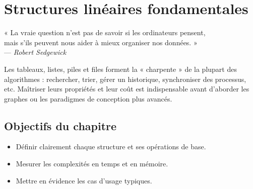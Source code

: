 
\chapter{Structures linéaires fondamentales}


\begin{flushright}\small
« La vraie question n’est pas de savoir si les ordinateurs pensent, \\
mais s’ils peuvent nous aider à mieux organiser nos données. »\\[-0.2em]
— \textit{Robert Sedgewick}
\end{flushright}

Les tableaux, listes, piles et files forment la « charpente » de la plupart
des algorithmes : rechercher, trier, gérer un historique, synchroniser des
processus, etc.  Maîtriser leurs propriétés et leur coût est indispensable
avant d’aborder les graphes ou les paradigmes de conception plus avancés.

\section*{Objectifs du chapitre}
\begin{itemize}[label=\small$\blacktriangleright$]
  \item Définir clairement chaque structure et ses opérations de base.
  \item Mesurer les complexités en temps et en mémoire.
  \item Mettre en évidence les cas d’usage typiques.
\end{itemize}\vspace{0.4em}

